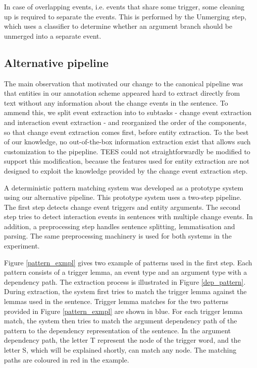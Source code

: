 In case of overlapping events, i.e. events that share some trigger, some cleaning up is required to separate the events. This is performed by the Unmerging step, which uses a classifier to determine whether an argument branch should be unmerged into a separate event. 

\subsection{Alternative pipeline}

The main observation that motivated our change to the canonical pipeline was that entities in our annotation scheme appeared hard to extract directly from text without any information about the change events in the sentence. To ammend this, we split event extraction into to subtasks - change event extraction and interaction event extraction - and reorganized the order of the components, so that change event extraction comes first, before entity extraction. To the best of our knowledge, no out-of-the-box information extraction exist that allows such customization to the pipepline. TEES could not straightforwardly be modified to support this modification, because the features used for entity extraction are not designed to exploit the knowledge provided by the change event extraction step.

A deterministic pattern matching system was developed as a prototype system using our alternative pipeline. This prototype system uses a two-step pipeline. The first step detects change event triggers and entity arguments. The second step tries to detect interaction events in sentences with multiple change events. In addition, a preprocessing step handles sentence splitting, lemmatisation and parsing. The same preprocessing machinery is used for both systems in the experiment.

Figure \ref{pattern_exmpl} gives two example of patterns used in the first step. Each pattern consists of a trigger lemma, an event type and an argument type with a dependency path. The extraction process is illustrated in Figure \ref{dep_pattern}. During extraction, the system first tries to match the trigger lemma against the lemmas used in the sentence. Trigger lemma matches for the two patterns provided in Figure \ref{pattern_exmpl} are shown in blue. For each trigger lemma match, the system then tries to match the argument dependency path of the pattern to the dependency representation of the sentence. In the argument dependency path, the letter T represent the node of the trigger word, and the letter S, which will be explained shortly, can match any node. The matching paths are coloured in red in the example. 

